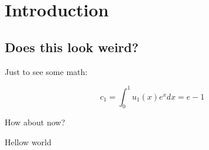 \chapter{Introduction}

\section{Does this look weird?}

Just to see some math:

\begin{equation}
  c_1 = \int^1_0 u_1 (x) e^x dx = e - 1
\end{equation}

\clearpage

\begin{table}
\caption{How about now?}
\end{table}

\clearpage 

Hellow world
